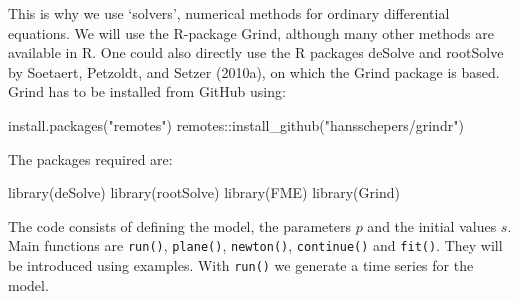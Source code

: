 \documentclass[
  letterpaper,
]{scrbook}
\newenvironment{Shaded}{\begin{snugshade}}{\end{snugshade}}
\newcommand{\FunctionTok}[1]{\textcolor[rgb]{0.28,0.35,0.67}{#1}}
\newcommand{\NormalTok}[1]{\textcolor[rgb]{0.00,0.23,0.31}{#1}}
\newcommand{\SpecialCharTok}[1]{\textcolor[rgb]{0.37,0.37,0.37}{#1}}
\newcommand{\StringTok}[1]{\textcolor[rgb]{0.13,0.47,0.30}{#1}}
\begin{document}
This is why we use `solvers', numerical methods for ordinary
differential equations. We will use the R-package Grind, although many
other methods are available in R. One could also directly use the R
packages deSolve and rootSolve by Soetaert, Petzoldt, and Setzer
(2010a), on which the Grind package is based. Grind has to be installed
from GitHub using:

\begin{Shaded}
\begin{Highlighting}[]
\FunctionTok{install.packages}\NormalTok{(}\StringTok{"remotes"}\NormalTok{)}
\NormalTok{remotes}\SpecialCharTok{::}\FunctionTok{install\_github}\NormalTok{(}\StringTok{"hansschepers/grindr"}\NormalTok{)}
\end{Highlighting}
\end{Shaded}

The packages required are:

\begin{Shaded}
\begin{Highlighting}[]
\FunctionTok{library}\NormalTok{(deSolve)}
\FunctionTok{library}\NormalTok{(rootSolve)}
\FunctionTok{library}\NormalTok{(FME)}
\FunctionTok{library}\NormalTok{(Grind)}
\end{Highlighting}
\end{Shaded}

The code consists of defining the model, the parameters \(p\) and the
initial values \(s\). Main functions are \texttt{run()},
\texttt{plane()}, \texttt{newton()}, \texttt{continue()} and
\texttt{fit()}. They will be introduced using examples. With
\texttt{run()} we generate a time series for the model.
\end{document}
